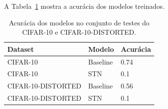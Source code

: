 \documentclass[conference]{IEEEtran}
\begin{document}
A Tabela~\ref{tab:c10-teste-accs} mostra a acurácia dos modelos treinados.

\begin{table}[!ht]
  \begin{center}
    \begin{tabular}{|l|l|l|}
      \hline
      \textbf{Dataset} & \textbf{Modelo} & \textbf{Acurácia} \\ \hline
      CIFAR-10           & Baseline & 0.74 \\ \hline
      CIFAR-10           & STN      & 0.1  \\ \hline
      CIFAR-10-DISTORTED & Baseline & 0.56 \\ \hline
      CIFAR-10-DISTORTED & STN      & 0.1  \\ \hline
    \end{tabular}
  \end{center}
  \caption{Acurácia dos modelos no conjunto de testes do CIFAR-10 e CIFAR-10-DISTORTED.}
  \label{tab:c10-teste-accs}
\end{table}





%
%
%






\end{document}
